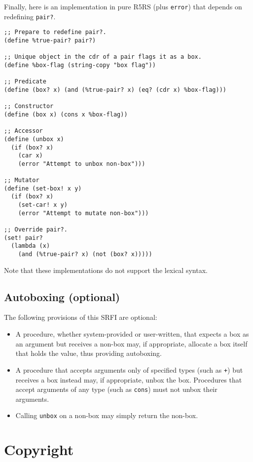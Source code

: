 Finally, here is an implementation in pure R5RS (plus \texttt{error})
that depends on redefining \texttt{pair?}.

\begin{verbatim}
;; Prepare to redefine pair?.
(define %true-pair? pair?)

;; Unique object in the cdr of a pair flags it as a box.
(define %box-flag (string-copy "box flag"))

;; Predicate
(define (box? x) (and (%true-pair? x) (eq? (cdr x) %box-flag)))

;; Constructor
(define (box x) (cons x %box-flag))

;; Accessor
(define (unbox x)
  (if (box? x)
    (car x)
    (error "Attempt to unbox non-box")))
    
;; Mutator
(define (set-box! x y)
  (if (box? x)
    (set-car! x y)
    (error "Attempt to mutate non-box")))

;; Override pair?.
(set! pair?
  (lambda (x)
    (and (%true-pair? x) (not (box? x)))))
\end{verbatim}

Note that these implementations do not support the lexical syntax.

\subsection{Autoboxing (optional)}\label{autoboxing-optional}

The following provisions of this SRFI are optional:

\begin{itemize}
\item
  A procedure, whether system-provided or user-written, that expects a
  box as an argument but receives a non-box may, if appropriate,
  allocate a box itself that holds the value, thus providing autoboxing.
\item
  A procedure that accepts arguments only of specified types (such as
  \texttt{+}) but receives a box instead may, if appropriate, unbox the
  box. Procedures that accept arguments of any type (such as
  \texttt{cons}) must not unbox their arguments.
\item
  Calling \texttt{unbox} on a non-box may simply return the non-box.
\end{itemize}

\section{Copyright}\label{copyright}

